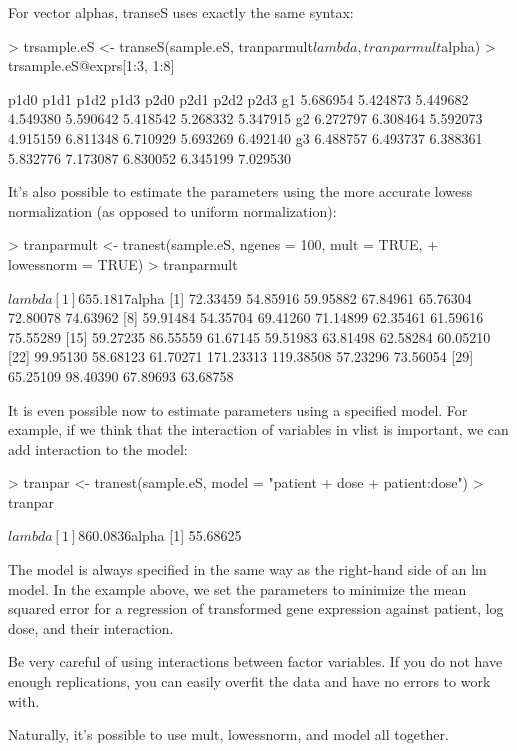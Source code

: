 \documentclass[11pt]{article}
\begin{document}
\begin{enumerate}
For vector alphas, transeS uses exactly the same syntax:
\begin{Schunk}
\begin{Sinput}
> trsample.eS <- transeS(sample.eS, tranparmult$lambda, tranparmult$alpha)
> trsample.eS@exprs[1:3, 1:8]
\end{Sinput}
\begin{Soutput}
       p1d0     p1d1     p1d2     p1d3     p2d0     p2d1     p2d2     p2d3
g1 5.686954 5.424873 5.449682 4.549380 5.590642 5.418542 5.268332 5.347915
g2 6.272797 6.308464 5.592073 4.915159 6.811348 6.710929 5.693269 6.492140
g3 6.488757 6.493737 6.388361 5.832776 7.173087 6.830052 6.345199 7.029530
\end{Soutput}
\end{Schunk}

It's also possible to estimate the parameters using the more accurate lowess normalization (as opposed to uniform normalization):

\begin{Schunk}
\begin{Sinput}
> tranparmult <- tranest(sample.eS, ngenes = 100, mult = TRUE, 
+     lowessnorm = TRUE)
> tranparmult
\end{Sinput}
\begin{Soutput}
$lambda
[1] 655.1817

$alpha
 [1]  72.33459  54.85916  59.95882  67.84961  65.76304  72.80078  74.63962
 [8]  59.91484  54.35704  69.41260  71.14899  62.35461  61.59616  75.55289
[15]  59.27235  86.55559  61.67145  59.51983  63.81498  62.58284  60.05210
[22]  99.95130  58.68123  61.70271 171.23313 119.38508  57.23296  73.56054
[29]  65.25109  98.40390  67.89693  63.68758
\end{Soutput}
\end{Schunk}


It is even possible now to estimate parameters using a specified model. For example, if we think that the interaction of variables in vlist is important, we can add interaction to the model:

\begin{Schunk}
\begin{Sinput}
> tranpar <- tranest(sample.eS, model = "patient + dose + patient:dose")
> tranpar
\end{Sinput}
\begin{Soutput}
$lambda
[1] 860.0836

$alpha
[1] 55.68625
\end{Soutput}
\end{Schunk}

The model is always specified in the same way as the right-hand side of an lm model. In the example above, we set the parameters to minimize the mean squared error for a regression of transformed gene expression against patient, log dose, and their interaction.

Be very careful of using interactions between factor variables. If you do not have enough replications, you can easily overfit the data and have no errors to work with.

Naturally, it's possible to use mult, lowessnorm, and model all together.


\end{enumerate}   
\end{document}
